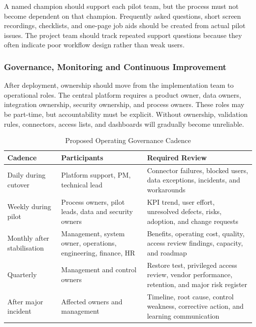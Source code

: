 \documentclass[12pt,a4paper]{report}
\begin{document}
A named champion should support each pilot team, but the process must not become dependent on
that champion. Frequently asked questions, short screen recordings, checklists, and one-page job
aids should be created from actual pilot issues. The project team should track repeated support
questions because they often indicate poor workflow design rather than weak users.

\subsubsection{Governance, Monitoring and Continuous Improvement}
\label{sec:governance-monitoring}

After deployment, ownership should move from the implementation team to operational roles. The
central platform requires a product owner, data owners, integration ownership, security ownership,
and process owners. These roles may be part-time, but accountability must be explicit. Without
ownership, validation rules, connectors, access lists, and dashboards will gradually become
unreliable.

\begin{table}[H]
\centering
\caption{Proposed Operating Governance Cadence}
\label{tab:governance-cadence}
\small
\renewcommand{\arraystretch}{1.18}
\begin{tabularx}{\textwidth}{>{\raggedright\arraybackslash}p{2.4cm}
                                >{\raggedright\arraybackslash}p{3.6cm}
                                >{\raggedright\arraybackslash}X}
\toprule
\textbf{Cadence} & \textbf{Participants} & \textbf{Required Review} \\
\midrule
Daily during cutover & Platform support, PM, technical lead & Connector failures, blocked users, data exceptions, incidents, and workarounds \\
Weekly during pilot & Process owners, pilot leads, data and security owners & KPI trend, user effort, unresolved defects, risks, adoption, and change requests \\
Monthly after stabilisation & Management, system owner, operations, engineering, finance, HR & Benefits, operating cost, quality, access review findings, capacity, and roadmap \\
Quarterly & Management and control owners & Restore test, privileged access review, vendor performance, retention, and major risk register \\
After major incident & Affected owners and management & Timeline, root cause, control weakness, corrective action, and learning communication \\
\bottomrule
\end{tabularx}
\end{table}
\end{document}
